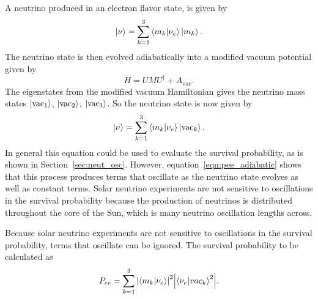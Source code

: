A neutrino produced in an electron flavor state, is given by
\begin{equation}
    \ket{\nu} = \sum_{k=1}^{3}\braket{m_{k}}{\nu_{e}}\ket{m_{k}}\text{.}
\end{equation}
The neutrino state is then evolved adiabatically into a modified
vacuum potential given by
\begin{equation}
    H = U M U^{\dagger} + A_{\mathrm{vac}}\text{.}
\end{equation}
The eigenstates from the modified vacuum Hamiltonian gives the neutrino mass
states $\ket{\mathrm{vac}_{1}}$, $\ket{\mathrm{vac}_{2}}$, $\ket{\mathrm{vac}_{3}}$.
So the neutrino state is now given by
\begin{equation}
    \ket{\nu} = \sum_{k=1}^{3}\braket{m_{k}}{\nu_{e}}\ket{\mathrm{vac}_{k}}\text{.}
\end{equation}
In general this equation could be used to evaluate the
survival probability, as is shown in Section~\ref{sec:neut_osc}.
However, equation~\ref{eqn:pee_adiabatic} shows that this process produces
terms that oscillate as the neutrino state evolves as well as constant
terms.
Solar neutrino experiments are not sensitive to oscillations in the survival
probability because the production of neutrinos is distributed
throughout the core of the Sun, which is many neutrino oscillation lengths
across.


Because solar neutrino experiments are not sensitive to oscillations in
the survival probability, terms that oscillate can be ignored.
The survival probability to be calculated as
\begin{equation}
    P_{ee} = \sum_{k=1}^{3}\abs{\braket{m_{k}}{\nu_{e}}}^{2}\abs{\braket{\nu_{e}}{vac_{k}}^{2}}\text{.}
\end{equation}

